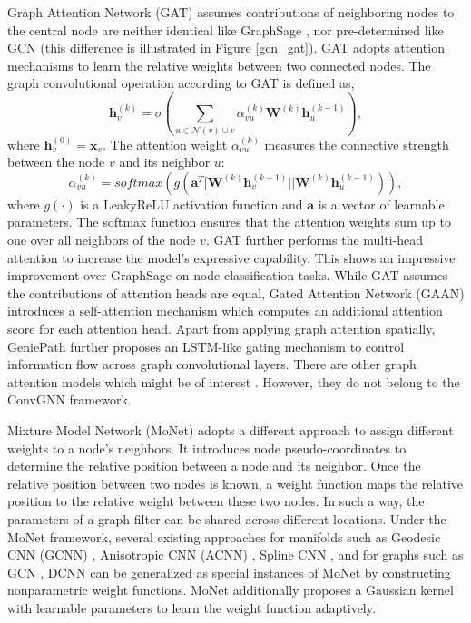 	
	Graph Attention Network (GAT) \cite{velickovic2017graph}
	assumes contributions of neighboring nodes to the central node are neither identical like GraphSage \cite{hamilton2017inductive}, nor pre-determined like GCN \cite{kipf2017semi} (this difference is illustrated in Figure \ref{gcn_gat}). GAT adopts attention mechanisms to learn the relative weights between two connected nodes.  The graph convolutional operation according to GAT is defined as,
	\begin{equation}
	\label{eq:13}
	\mathbf{h}_v^{(k)} = \sigma(\sum_{u\in\mathcal{N}(v)\cup v}\alpha_{vu}^{(k)}\mathbf{W}^{(k)}\mathbf{h}_u^{(k-1)}),
	\end{equation}
	where $\mathbf{h}^{(0)}_v=\mathbf{x}_v$. The attention weight $\alpha_{vu}^{(k)}$ measures the connective strength between the node $v$ and its neighbor $u$:
	\begin{equation}
	    \alpha_{vu}^{(k)} = softmax(g(\mathbf{a}^T[\mathbf{W}^{(k)}\mathbf{h}_v^{(k-1)}||\mathbf{W}^{(k)}\mathbf{h}_u^{(k-1)})),
	\end{equation}
	where $g(\cdot)$ is a LeakyReLU activation function and $\mathbf{a}$ is a vector of learnable parameters. The softmax function ensures that the attention weights sum up to one over all neighbors of the node $v$.
	GAT further performs the multi-head attention to increase the model's expressive capability. This shows an impressive improvement over GraphSage on node classification tasks. While GAT assumes the contributions of attention heads are equal, Gated  Attention  Network (GAAN) \cite{zhang2018gaan} introduces a self-attention  mechanism  which computes an additional attention score for each attention head. Apart from applying graph attention spatially, GeniePath \cite{liu2018geniepath} further proposes an LSTM-like gating mechanism to control information flow across graph convolutional layers. There are other graph attention models which might be of interest \cite{lee2018graph,abu2018watch}. However, they do not belong to the ConvGNN framework. %
	
	Mixture Model Network (MoNet) \cite{monti2017geometric}
    adopts a different approach to assign different weights to a node's neighbors. It introduces node pseudo-coordinates to determine the relative position between a node and its neighbor. Once the relative position between two nodes is known, a weight function maps the relative position to the relative weight between these two nodes. In such a way, the parameters of a graph filter can be shared across different locations.  Under the MoNet framework, several existing approaches for manifolds such as Geodesic CNN (GCNN) \cite{masci2015geodesic}, Anisotropic CNN (ACNN) \cite{boscaini2016learning}, Spline CNN \cite{fey2018splinecnn}, and for graphs such as GCN \cite{kipf2017semi}, DCNN \cite{atwood2016diffusion} can be generalized as special instances of MoNet by constructing nonparametric weight functions.  MoNet additionally proposes a Gaussian kernel with learnable parameters to learn the weight function adaptively.
    
